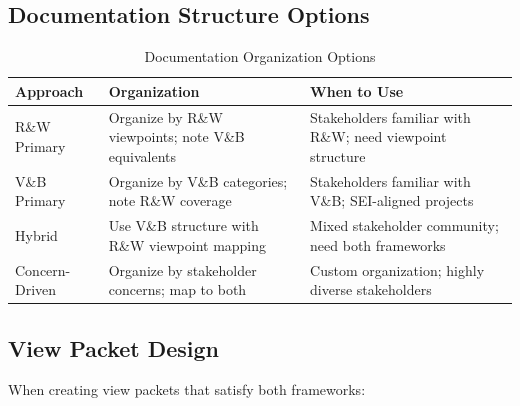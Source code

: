 \documentclass[11pt]{article}
\begin{document}
\subsection{Documentation Structure Options}

\begin{longtable}{@{}L{3cm} L{4cm} L{5.5cm}@{}}
\caption{Documentation Organization Options} \\
\toprule
\textbf{Approach} & \textbf{Organization} & \textbf{When to Use} \\
\midrule
\endfirsthead
\bottomrule
\endlastfoot
R\&W Primary & Organize by R\&W viewpoints; note V\&B equivalents & Stakeholders familiar with R\&W; need viewpoint structure \\
V\&B Primary & Organize by V\&B categories; note R\&W coverage & Stakeholders familiar with V\&B; SEI-aligned projects \\
Hybrid & Use V\&B structure with R\&W viewpoint mapping & Mixed stakeholder community; need both frameworks \\
Concern-Driven & Organize by stakeholder concerns; map to both & Custom organization; highly diverse stakeholders \\
\end{longtable}

\subsection{View Packet Design}

When creating view packets that satisfy both frameworks:
\end{document}
